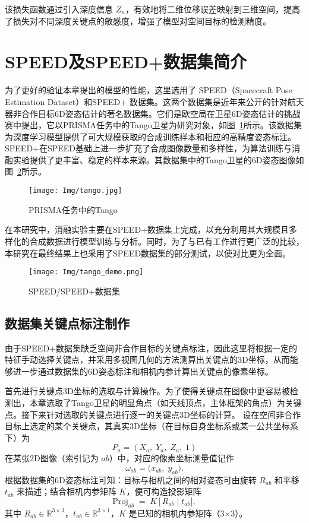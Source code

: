 该损失函数通过引入深度信息 $Z_n$，有效地将二维位移误差映射到三维空间，提高了损失对不同深度关键点的敏感度，增强了模型对空间目标的检测精度。

\section{SPEED及SPEED+数据集简介}
为了更好的验证本章提出的模型的性能，这里选用了
SPEED（Spacecraft Pose Estimation Dataset）\cite{SPEED-Dataset}和SPEED+ \cite{speed+}数据集。这两个数据集是近年来公开的针对航天器非合作目标6D姿态估计的著名数据集。它们是欧空局在卫星6D姿态估计的挑战赛中提出，它以PRISMA任务中的Tango卫星为研究对象，如图~\ref{fig:tango}所示。该数据集为深度学习模型提供了可大规模获取的合成训练样本和相应的高精度姿态标注。SPEED+在SPEED基础上进一步扩充了合成图像数量和多样性，为算法训练与消融实验提供了更丰富、稳定的样本来源。其数据集中的Tango卫星的6D姿态图像如图~\ref{fig:tango_demo}所示。
\begin{figure}[htbp]
	\centering
	\texttt{[image: Img/tango.jpg]}
	\caption{PRISMA任务中的Tango}
	\label{fig:tango}
\end{figure}
在本研究中，消融实验主要在SPEED+数据集上完成，以充分利用其大规模且多样化的合成数据进行模型训练与分析。同时，为了与已有工作进行更广泛的比较，本研究在最终结果上也采用了SPEED数据集的部分测试，以使对比更为全面。

\begin{figure}[htbp]
	\centering
	\texttt{[image: Img/tango\_demo.png]}
	\caption{SPEED/SPEED+数据集}
	\label{fig:tango_demo}
\end{figure}
\subsection{数据集关键点标注制作}
由于SPEED+数据集缺乏空间非合作目标的关键点标注，因此这里将根据一定的特征手动选择关键点，并采用多视图几何的方法测算出关键点的3D坐标，从而能够进一步通过数据集的6D姿态标注和相机内参计算出关键点的像素坐标。

首先进行关键点3D坐标的选取与计算操作。为了使得关键点在图像中更容易被检测出，本章选取了Tango卫星的明显角点（如天线顶点，主体框架的角点）为关键点。接下来针对选取的关键点进行逐一的关键点3D坐标的计算。
设在空间非合作目标上选定的某个关键点，其真实3D坐标（在目标自身坐标系或某一公共坐标系下）为
\begin{equation}
	P_a = (X_a,\; Y_a,\; Z_a,\; 1)
\end{equation}
在某张2D图像（索引记为 $ab$）中，对应的像素坐标测量值记作
\begin{equation}
	\omega_{ab} = \bigl(x_{ab},\; y_{ab}\bigr).
\end{equation}
根据数据集的6D姿态标注可知：目标与相机之间的相对姿态可由旋转 $R_{ab}$ 和平移 $t_{ab}$ 来描述；结合相机内参矩阵 $K$，便可构造投影矩阵
\begin{equation}\label{eq:proj_ab_def}
	\mathrm{Proj}_{ab} \;=\; K\,\bigl[\,R_{ab}\;\big\vert\;t_{ab}\bigr],
\end{equation}
其中 $R_{ab}\in\mathbb{R}^{3\times 3}$，$t_{ab}\in\mathbb{R}^{3\times 1}$，$K$ 是已知的相机内参矩阵（3$\times$3）。

